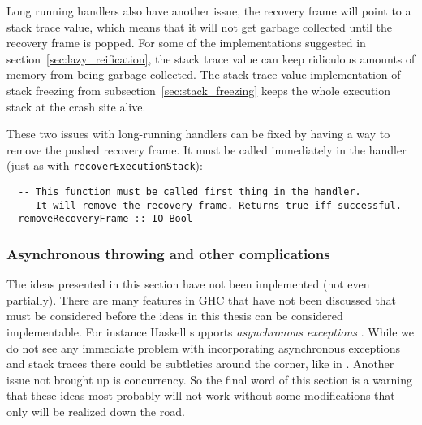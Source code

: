 Long running handlers also have another issue, the
recovery frame will point to a stack trace value, which means that it
will not get garbage collected until the recovery frame is
popped. For some of the implementations suggested in section~\ref{sec:lazy_reification}, the stack trace value can keep ridiculous
amounts of memory from being garbage collected. The stack trace value
implementation of stack freezing from subsection~\ref{sec:stack_freezing} keeps the whole execution stack at the crash
site alive.

These two issues with long-running handlers can be fixed by having a
way to remove the pushed recovery frame. It must be called immediately
in the handler (just as with \texttt{recoverExecutionStack}):

\begin{verbatim}
  -- This function must be called first thing in the handler. 
  -- It will remove the recovery frame. Returns true iff successful.
  removeRecoveryFrame :: IO Bool
\end{verbatim}

\subsubsection{Asynchronous throwing and other complications}

The ideas presented in this section have not been implemented (not
even partially). There are many features in GHC that have not been
discussed that must be considered before the ideas in this thesis
can be considered implementable. For instance Haskell supports
\emph{asynchronous exceptions} \cite{marlow2001asynchronous}. While
we do not see any immediate problem with incorporating asynchronous
exceptions and stack traces there could be subtleties around the corner,
like in \cite{edsko_dark_corners_of_throwTo}. Another issue not brought
up is concurrency. So the final word of this section is a warning that
these ideas most probably will not work without some modifications that
only will be realized down the road.
